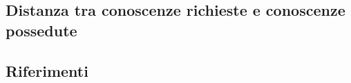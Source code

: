 \label{4.2}
\subsection{Distanza tra conoscenze richieste e conoscenze possedute}

\label{4.3}
\newpage

\printglossaries
{}
\label{5.0}

\newpage
\subsection*{Riferimenti}
\label{6.0}
\newpage





